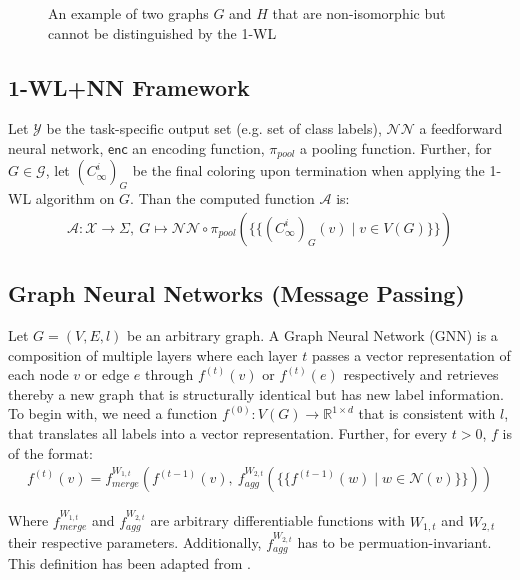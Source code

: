 \documentclass[11pt, dvipsnames, DIV=12]{scrreprt}
\theoremstyle{definition}
\newcommand{\MSopen}{\{\!\!\{}
\newcommand{\MSclose}{\}\!\!\}}
\begin{document}
\begin{figure}[H]
    \centering
    
    \caption{An example of two graphs $G$ and $H$ that are non-isomorphic but cannot be distinguished by the 1-WL}
    \label{1-WL Counter Example}
\end{figure}

\subsection{1-WL+NN Framework}\label{sec:1-WL+NN Definition}
Let $\mathcal{Y}$ be the task-specific output set (e.g. set of class labels), $\mathcal{NN}$ a feedforward neural network, $\textsf{enc}$ an encoding function, $\pi_{pool}$ a pooling function. Further, for $G \in \mathcal{G}$, let $(C^i_\infty)_{G}$ be the final coloring upon termination when applying the 1-WL algorithm on $G$. Than the computed function $\mathcal{A}$ is:
\begin{align}
\mathcal{A}: \mathcal{X} \rightarrow \Sigma, \  G \mapsto \mathcal{NN} \circ \pi_{pool}(\MSopen (C^i_\infty)_{G}(v) \mid v \in V(G) \MSclose)
\end{align}

\subsection{Graph Neural Networks (Message Passing)}\label{sec:GNN Defintion}
Let $G = (V, E, l)$ be an arbitrary graph. A Graph Neural Network (GNN) is a composition of multiple layers where each layer $t$ passes a vector representation of each node $v$ or edge $e$ through $f^{(t)}(v)$ or $f^{(t)}(e)$ respectively and retrieves thereby a new graph that is structurally identical but has new label information. To begin with, we need a function $f^{(0)}: V(G) \rightarrow \mathbb{R}^{1 \times d}$ that is consistent with $l$, that translates all labels into a vector representation. Further, for every $t > 0$, $f$ is of the format:
\begin{align}
f^{(t)}(v) = f^{W_{1,t}}_{merge} (f^{(t-1)}(v), \  f^{W_{2,t}}_{agg}( \MSopen f^{(t-1)}(w) \mid w \in \mathcal{N}(v) \MSclose ))
\end{align}

\noindent Where $f^{W_{1,t}}_{merge}$ and $f^{W_{2,t}}_{agg}$ are arbitrary differentiable functions with $W_{1,t}$ and $W_{2,t}$ their respective parameters. Additionally, $f^{W_{2,t}}_{agg}$ has to be permuation-invariant. This definition has been adapted from \cite{Morris2018}.
\end{document}
